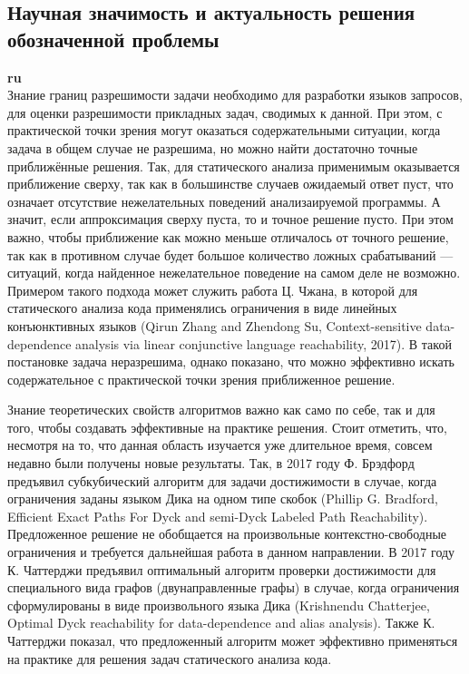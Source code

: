 \documentclass[12pt]{article}  %
\theoremstyle{remark}
\begin{document}
\subsection{Научная значимость и актуальность решения обозначенной проблемы}

\textbf{ru}\\
%
Знание границ разрешимости задачи необходимо для разработки языков запросов, для оценки разрешимости прикладных задач, сводимых к данной.
При этом, с практической точки зрения могут оказаться содержательными ситуации, когда задача в общем случае не разрешима, но можно найти достаточно точные приближённые решения. Так, для статического анализа применимым  оказывается приближение сверху, так как в большинстве случаев ожидаемый ответ пуст, что означает отсутствие нежелательных поведений анализаируемой программы. А значит, если аппроксимация сверху пуста, то и точное решение пусто. При этом важно, чтобы приближение как можно меньше отличалось от точного решение, так как в противном случае будет большое количество ложных срабатываний --- ситуаций, когда найденное нежелательное поведение на самом деле не возможно.
Примером такого подхода может служить работа Ц. Чжана, в которой для статического анализа кода применялись ограничения в виде линейных конъюнктивных языков (Qirun Zhang and Zhendong Su, Context-sensitive data-dependence analysis via linear conjunctive language reachability, 2017). В такой постановке задача неразрешима, однако показано, что можно эффективно искать содержательное с практической точки зрения приближенное решение.

Знание теоретических свойств алгоритмов важно как само по себе, так и для того, чтобы создавать эффективные на практике решения.
Стоит отметить, что, несмотря на то, что данная область изучается уже длительное время, совсем недавно были получены новые результаты. Так, в 2017 году Ф. Брэдфорд предъявил субкубический алгоритм для задачи достижимости в случае, когда ограничения заданы языком Дика на одном типе скобок (Phillip G. Bradford, Efficient Exact Paths For Dyck and semi-Dyck Labeled Path Reachability). Предложенное решение не обобщается на произвольные контекстно-свободные ограничения и требуется дальнейшая работа в данном направлении.
В 2017 году К. Чаттерджи предъявил оптимальный алгоритм проверки достижимости для специального вида графов (двунаправленные графы) в случае, когда ограничения сформулированы в виде произвольного языка Дика (Krishnendu Chatterjee, Optimal Dyck reachability for data-dependence and alias analysis). Также К. Чаттерджи показал, что предложенный алгоритм может эффективно применяться на практике для решения задач статического анализа кода.
\end{document}
